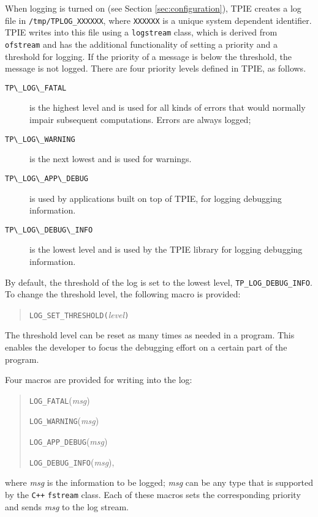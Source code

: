 When logging is turned on (see Section \ref{sec:configuration}), TPIE
creates a log file in \verb|/tmp/TPLOG_XXXXXX|, where
\verb|XXXXXX| is a unique system dependent identifier. TPIE writes into
this file using a \verb|logstream| class, which is derived from
\verb|ofstream| and has the additional functionality of setting a priority
and a threshold for logging. If the priority of a message is below
 the threshold, the message is not logged. There are four priority
levels defined in TPIE, as follows.
\begin{description}
\item[\verb|TP\_LOG\_FATAL|] is the highest level and is used for all kinds
of errors that would normally impair subsequent computations. Errors are
always logged;
\item[\verb|TP\_LOG\_WARNING|] is the next lowest and is used for warnings.
\item[\verb|TP\_LOG\_APP\_DEBUG|] is used by applications built on top of TPIE, for logging debugging information.
\item[\verb|TP\_LOG\_DEBUG\_INFO|] is the lowest level and is used by the TPIE library for logging debugging information.
\end{description}
By default, the threshold of the log is set to the lowest level, \verb|TP_LOG_DEBUG_INFO|. To change the threshold level, the following macro is provided:
\begin{quote}
\verb|LOG_SET_THRESHOLD(|{\em level}\verb|)|
\end{quote}
The threshold level can be reset as many times as needed in a program. This enables the developer to focus the debugging effort on a certain part of the program.

Four macros are provided for writing into the log:
\begin{quote}
\verb|LOG_FATAL|({\em msg})

\verb|LOG_WARNING|({\em msg})

\verb|LOG_APP_DEBUG|({\em msg})

\verb|LOG_DEBUG_INFO|({\em msg}),
\end{quote}
where {\em msg} is the information to be logged; {\em msg} can be any type
that is supported by the \verb|C++| \verb|fstream| class. Each of these
macros sets the corresponding priority and sends {\em msg} to the log
stream.



